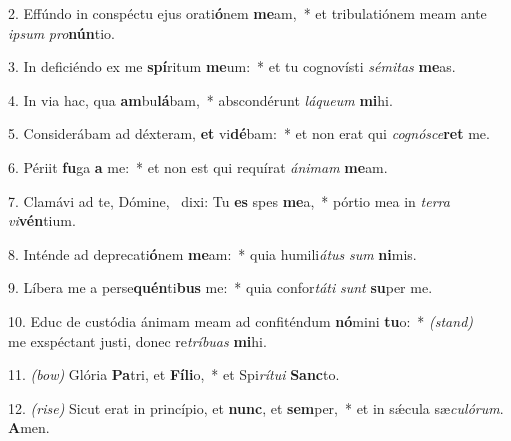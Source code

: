 2. Effúndo in conspéctu ejus orati\textbf{ó}nem \textbf{me}am,~* et tribulatiónem meam ante \textit{ip}\textit{sum} \textit{pro}\textbf{nún}tio.

3. In deficiéndo ex me \textbf{spí}ritum \textbf{me}um:~* et tu cognovísti \textit{sé}\textit{mi}\textit{tas} \textbf{me}as.

4. In via hac, qua \textbf{am}bu\textbf{lá}bam,~* abscondérunt \textit{lá}\textit{que}\textit{um} \textbf{mi}hi.

5. Considerábam ad déxteram, \textbf{et} vi\textbf{dé}bam:~* et non erat qui \textit{co}\textit{gnó}\textit{sce}\textbf{ret} me.

6. Périit \textbf{fu}ga \textbf{a} me:~* et non est qui requírat \textit{á}\textit{ni}\textit{mam} \textbf{me}am.

7. Clamávi ad te, Dómine,~{\color{red}\GreDagger} dixi: Tu \textbf{es} spes \textbf{me}a,~* pórtio mea in \textit{ter}\textit{ra} \textit{vi}\textbf{vén}tium.

8. Inténde ad deprecati\textbf{ó}nem \textbf{me}am:~* quia humili\textit{á}\textit{tus} \textit{sum} \textbf{ni}mis.

9. Líbera me a perse\textbf{quén}ti\textbf{bus} me:~* quia confor\textit{tá}\textit{ti} \textit{sunt} \textbf{su}per me.

10. Educ de custódia ánimam meam ad confiténdum \textbf{nó}mini \textbf{tu}o:~* {\color{red}\textit{(stand)}}\\ me exspéctant justi, donec re\textit{trí}\textit{bu}\textit{as} \textbf{mi}hi.

11. {\color{red}\textit{(bow)}} Glória \textbf{Pa}tri, et \textbf{Fí}\textbf{li}o,~* et Spi\textit{rí}\textit{tu}\textit{i} \textbf{Sanc}to.

12. {\color{red}\textit{(rise)}} Sicut erat in princípio, et \textbf{nunc}, et \textbf{sem}per,~* et in s\'{\ae}cula sæ\textit{cu}\textit{ló}\textit{rum}. \textbf{A}men.